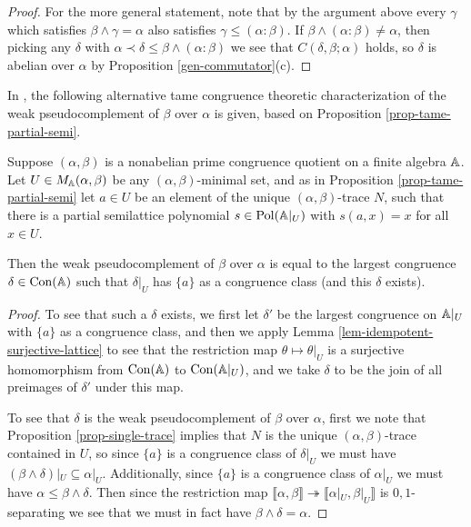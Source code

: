 \begin{appendices}
\begin{proof}
For the more general statement, note that by the argument above every $\gamma$ which satisfies $\beta \wedge \gamma = \alpha$ also satisfies $\gamma \le (\alpha : \beta)$. If $\beta \wedge (\alpha : \beta) \ne \alpha$, then picking any $\delta$ with $\alpha \prec \delta \le \beta \wedge (\alpha : \beta)$ we see that $C(\delta, \beta; \alpha)$ holds, so $\delta$ is abelian over $\alpha$ by Proposition \ref{gen-commutator}(c).
\end{proof}

In \cite{hobby-mckenzie}, the following alternative tame congruence theoretic characterization of the weak pseudocomplement of $\beta$ over $\alpha$ is given, based on Proposition \ref{prop-tame-partial-semi}.

\begin{prop} Suppose $(\alpha,\beta)$ is a nonabelian prime congruence quotient on a finite algebra $\mathbb{A}$. Let $U \in M_{\mathbb{A}}(\alpha,\beta)$ be any $(\alpha,\beta)$-minimal set, and as in Proposition \ref{prop-tame-partial-semi} let $a \in U$ be an element of the unique $(\alpha,\beta)$-trace $N$, such that there is a partial semilattice polynomial $s \in \operatorname{Pol}(\mathbb{A}|_U)$ with $s(a,x) = x$ for all $x \in U$.

Then the weak pseudocomplement of $\beta$ over $\alpha$ is equal to the largest congruence $\delta \in \operatorname{Con}(\mathbb{A})$ such that $\delta|_U$ has $\{a\}$ as a congruence class (and this $\delta$ exists).
\end{prop}
\begin{proof} To see that such a $\delta$ exists, we first let $\delta'$ be the largest congruence on $\mathbb{A}|_U$ with $\{a\}$ as a congruence class, and then we apply Lemma \ref{lem-idempotent-surjective-lattice} to see that the restriction map $\theta \mapsto \theta|_U$ is a surjective homomorphism from $\operatorname{Con}(\mathbb{A})$ to $\operatorname{Con}(\mathbb{A}|_U)$, and we take $\delta$ to be the join of all preimages of $\delta'$ under this map.

To see that $\delta$ is the weak pseudocomplement of $\beta$ over $\alpha$, first we note that Proposition \ref{prop-single-trace} implies that $N$ is the unique $(\alpha,\beta)$-trace contained in $U$, so since $\{a\}$ is a congruence class of $\delta|_U$ we must have $(\beta \wedge \delta)|_U \subseteq \alpha|_U$. Additionally, since $\{a\}$ is a congruence class of $\alpha|_U$ we must have $\alpha \le \beta \wedge \delta$. Then since the restriction map $\llbracket \alpha, \beta \rrbracket \twoheadrightarrow \llbracket \alpha|_U, \beta|_U \rrbracket$ is $0,1$-separating we see that we must in fact have $\beta \wedge \delta = \alpha$.


\end{proof}
\end{appendices}

